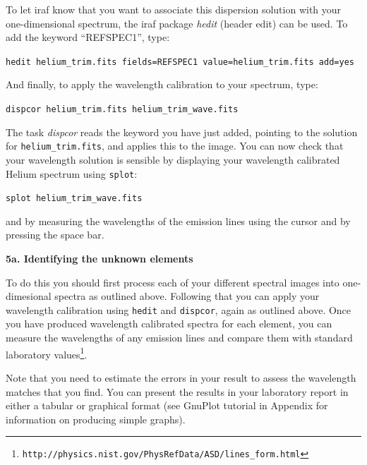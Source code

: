\documentclass[12pt]{article}
\begin{document}
To let {\sc iraf} know that you want to associate this dispersion
solution with your one-dimensional spectrum, the {\sc iraf} package {\it hedit} (header edit) can be used. To add
the keyword ``REFSPEC1'', type:

{\tt hedit helium\verb,_trim.fits, fields=REFSPEC1 value=helium\verb,_trim.fits, add=yes}

And finally, to apply the wavelength calibration to your spectrum, type:

{\tt dispcor helium\verb,_trim.fits helium_trim_wave.fits,}

The task {\it dispcor} reads the keyword you have just added, pointing to the solution for {\tt \verb,helium_trim.fits,}, and applies this to the image.
You can now check that your wavelength solution is sensible by
displaying your wavelength calibrated Helium spectrum using {\tt splot}:

{\tt splot \verb,helium_trim_wave.fits,}

and by measuring the wavelengths of the emission lines using the
cursor and by pressing the space bar.

\newpage


\bigskip
{\bf 5a. Identifying the unknown elements}

\noindent
To do this you should first process each of your different spectral images into
one-dimesional spectra as outlined above. Following that you can apply
your wavelength calibration using {\tt hedit} and {\tt dispcor}, again
as outlined above. Once you have produced wavelength calibrated
spectra for each element, you can measure the wavelengths of any
emission lines and compare them with standard laboratory values\footnote{
{\tt http://physics.nist.gov/PhysRefData/ASD/lines\_form.html}}. 

Note that you need to estimate the errors in your result to assess the wavelength matches
that you find. You can present the results in your laboratory report
in either a tabular or graphical format (see GnuPlot tutorial in
Appendix for information on producing simple graphs).
\end{document}
